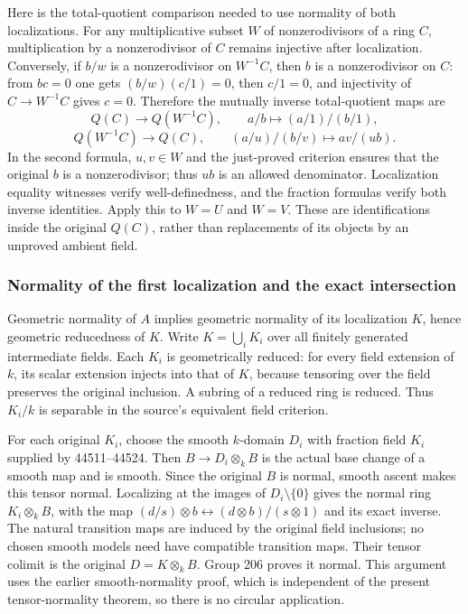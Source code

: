 Here is the total-quotient comparison needed to use normality of both localizations. For any multiplicative subset \(W\) of nonzerodivisors of a ring \(C\), multiplication by a nonzerodivisor of \(C\) remains injective after localization. Conversely, if \(b/w\) is a nonzerodivisor on \(W^{-1}C\), then \(b\) is a nonzerodivisor on \(C\): from \(bc=0\) one gets \((b/w)(c/1)=0\), then \(c/1=0\), and injectivity of \(C\to W^{-1}C\) gives \(c=0\). Therefore the mutually inverse total-quotient maps are \[
 Q(C)\longrightarrow Q(W^{-1}C),\qquad
 a/b\longmapsto(a/1)/(b/1),
\] \[
 Q(W^{-1}C)\longrightarrow Q(C),\qquad
 (a/u)/(b/v)\longmapsto av/(ub).
\] In the second formula, \(u,v\in W\) and the just-proved criterion ensures that the original \(b\) is a nonzerodivisor; thus \(ub\) is an allowed denominator. Localization equality witnesses verify well-definedness, and the fraction formulas verify both inverse identities. Apply this to \(W=U\) and \(W=V\). These are identifications inside the original \(Q(C)\), rather than replacements of its objects by an unproved ambient field.

\subsubsection{Normality of the first localization and the exact intersection}\label{algebra-proof-070-normality-of-the-first-localization-and-the-exact-intersection}

Geometric normality of \(A\) implies geometric normality of its localization \(K\), hence geometric reducedness of \(K\). Write \(K=\bigcup_iK_i\) over all finitely generated intermediate fields. Each \(K_i\) is geometrically reduced: for every field extension of \(k\), its scalar extension injects into that of \(K\), because tensoring over the field preserves the original inclusion. A subring of a reduced ring is reduced. Thus \(K_i/k\) is separable in the source's equivalent field criterion.

For each original \(K_i\), choose the smooth \(k\)-domain \(D_i\) with fraction field \(K_i\) supplied by 44511--44524. Then \(B\to D_i\otimes_kB\) is the actual base change of a smooth map and is smooth. Since the original \(B\) is normal, smooth ascent makes this tensor normal. Localizing at the images of \(D_i\setminus\{0\}\) gives the normal ring \(K_i\otimes_kB\), with the map \((d/s)\otimes b\leftrightarrow(d\otimes b)/(s\otimes1)\) and its exact inverse. The natural transition maps are induced by the original field inclusions; no chosen smooth models need have compatible transition maps. Their tensor colimit is the original \(D=K\otimes_kB\). Group 206 proves it normal. This argument uses the earlier smooth-normality proof, which is independent of the present tensor-normality theorem, so there is no circular application.

